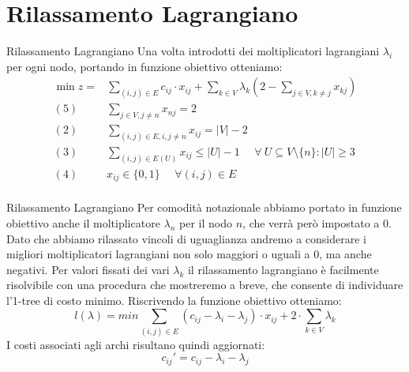\documentclass[10pt]{beamer}
\begin{document}
\section{Rilassamento Lagrangiano}
\begin{frame}{Rilassamento Lagrangiano}
    Una volta introdotti dei moltiplicatori lagrangiani $\lambda_i$ per ogni nodo, portando in funzione obiettivo otteniamo:
    \begin{equation*}
        \begin{split}
             \min z = & \sum_{(i,j) \in E} c_{ij} \cdot x_{ij} + \sum_{k\in V} \lambda_k (2 - \sum_{j\in V, k\neq j} x_{kj})\\
            (5)\:\:\:\:\:\: & \sum_{j \in V, j \neq n} x_{nj} = 2 \\
            (2) \:\:\:\:\:\: & \sum_{(i,j)\in E, i, j \neq n} x_{ij} = |V|-2 \\
            (3) \:\:\:\:\:\: & \sum_{(i,j) \in E(U)} x_{ij} \leq |U| - 1 \:\:\:\:\:\: \forall\: U \subseteq V\setminus\{n\} : |U| \geq 3 \\
            (4) \:\:\:\:\:\: & x_{ij} \in \{0,1\} \:\:\:\:\:\: \forall (i,j) \in E\\
        \end{split}
    \end{equation*}
\end{frame}

\begin{frame}{Rilassamento Lagrangiano}
    Per comodità notazionale abbiamo portato in funzione obiettivo anche il moltiplicatore $\lambda_n$ per il nodo $n$, che verrà però impostato a 0. Dato che abbiamo rilassato vincoli di uguaglianza andremo a considerare i migliori moltiplicatori lagrangiani non solo maggiori o uguali a 0, ma anche negativi. Per valori fissati dei vari $\lambda_k$ il rilassamento lagrangiano è facilmente risolvibile con una procedura che mostreremo a breve, che consente di individuare l'1-tree di costo minimo.
    \newline
    \newline
    Riscrivendo la funzione obiettivo otteniamo:
    \begin{equation*}
        l(\lambda) = min \sum_{(i,j)\in E} ( c_{ij} - \lambda_i - \lambda_j) \cdot x_{ij} + 2 \cdot \sum_{k \in V} \lambda_k
    \end{equation*}
    I costi associati agli archi risultano quindi aggiornati:
    \begin{equation*}
        c_{ij}' = c_{ij} - \lambda_i - \lambda_j
    \end{equation*}
\end{frame}
\end{document}
